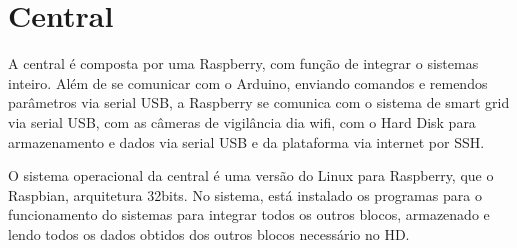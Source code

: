 \section{Central}
\par A central é composta por uma Raspberry, com função de integrar o sistemas inteiro. Além de se comunicar com o Arduino, enviando comandos e remendos parâmetros via serial USB, a Raspberry se comunica com o sistema de smart grid via serial USB, com as câmeras de vigilância dia wifi, com o Hard Disk para armazenamento e dados via serial USB e da plataforma via internet por SSH.
\par O sistema operacional da central é uma versão do Linux para Raspberry, que o Raspbian, arquitetura 32bits. No sistema, está instalado os programas para o funcionamento do sistemas para integrar todos os outros blocos, armazenado e lendo todos os dados obtidos dos outros blocos necessário no HD.


